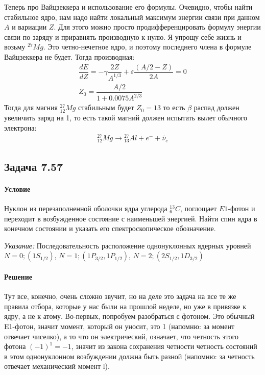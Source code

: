 \documentclass[12pt]{article}
\begin{document}
Теперь про Вайцзеккера и использование его формулы. Очевидно, чтобы найти стабильное ядро, нам надо найти локальный максимум энергии связи при данном $A$ и вариации $Z$. Для этого можно просто продифференцировать формулу энергии связи по заряду и приравнять производную к нулю. Я упрощу себе жизнь и возьму ${}^{27}Mg$. Это четно-нечетное ядро, и поэтому последнего члена в формуле Вайцзеккера не будет. Тогда производная:
\begin{gather*}
    \dfrac{dE}{dZ} = -\gamma \dfrac{2Z}{A^{1/3}} + \varepsilon \dfrac{(A/2-Z)}{2A} = 0\\
    Z_0 = \dfrac{A/2}{1 + 0.0075 A^{2/3}}
\end{gather*}
Тогда для магния ${}^{27}_{12}Mg$ стабильным будет $Z_0=13$ то есть $\beta$ распад должен увеличить заряд на 1, то есть такой магний должен испытать вылет обычного электрона:
 \begin{gather*}
     {}^{27}_{12}Mg \rightarrow {}^{27}_{13}Al + e^- + \widetilde{\nu_e}
\end{gather*}

\subsection{Задача 7.57}
\label{task_2}
\paragraph{Условие}
Нуклон из перезаполненной оболочки ядра углерода ${}^{13}_6C$, поглощает $E1$-фотон и переходит в возбужденное состояние с наименьшей энергией. Найти спин ядра в конечном состоянии и указать его спектроскопическое обозначение.

\textit{Указание:} Последовательность расположение однонуклонных ядерных уровней $N=0;(1S_{1/2})$, $N=1;(1P_{3/2}, 1P_{1/2})$, $N=2;(2S_{1/2}, 1D_{3/2})$
\paragraph{Решение}
Тут все, конечно, очень сложно звучит, но на деле это задача на все те же правила отбора, которые у нас были на прошлой неделе, но уже в привязке к ядру, а не к атому. Во-первых, попробуем разобраться с фотоном. Это обычный E1-фотон, значит момент, который он уносит, это 1 (напомню: за момент отвечает чиселко), а то что он электрический, означает, что четность этого фотона $(-1)^1 = -1$, значит из закона сохранения четности четность состояний в этом однонуклонном возбуждении должна быть разной (напомню: за четность отвечает механический момент l).
\end{document}
